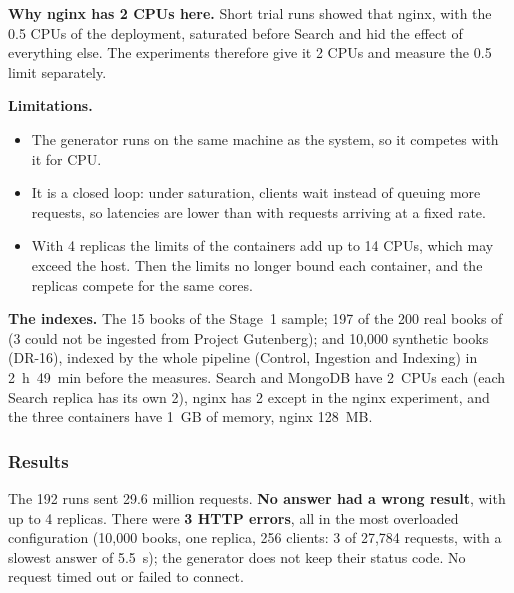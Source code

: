\textbf{Why nginx has 2 CPUs here.} Short trial runs showed that nginx, with the 0.5 CPUs of the deployment,
saturated before Search and hid the effect of everything else. The experiments therefore give it 2 CPUs and measure
the 0.5 limit separately.

\textbf{Limitations.}
\begin{itemize}
  \item The generator runs on the same machine as the system, so it competes with it for CPU.
  \item It is a closed loop: under saturation, clients wait instead of queuing more requests, so latencies are lower
        than with requests arriving at a fixed rate.
  \item With 4 replicas the limits of the containers add up to 14 CPUs, which may exceed the host. Then the limits no
        longer bound each container, and the replicas compete for the same cores.
\end{itemize}

\textbf{The indexes.} The 15 books of the Stage~1 sample; 197 of the 200 real books of 
(3 could not be ingested from Project Gutenberg); and 10,000 synthetic books (DR-16), indexed by the whole pipeline
(Control, Ingestion and Indexing) in 2~h~49~min before the measures. Search and MongoDB have 2~CPUs each (each Search
replica has its own 2), nginx has 2 except in the nginx experiment, and the three containers have 1~GB of memory,
nginx 128~MB.

\subsubsection{Results}

The 192 runs sent 29.6 million requests. \textbf{No answer had a wrong result}, with up to 4 replicas. There were
\textbf{3 HTTP errors}, all in the most overloaded configuration (10,000 books, one replica, 256 clients: 3 of 27,784
requests, with a slowest answer of 5.5~s); the generator does not keep their status code. No request timed out or
failed to connect.


